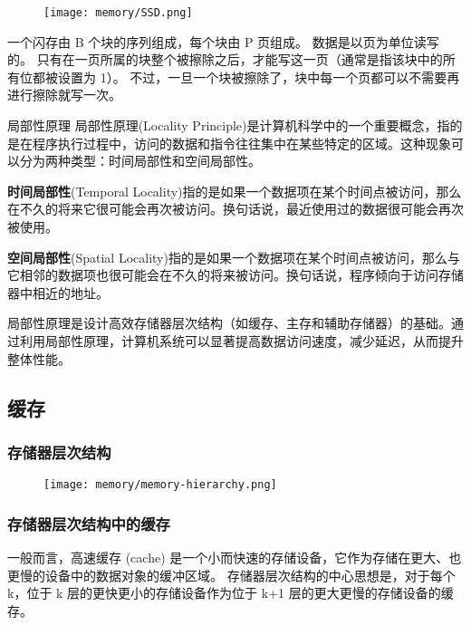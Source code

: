 \begin{figure}[H]
    \centering
    \texttt{[image: memory/SSD.png]}
\end{figure}

一个闪存由 B 个块的序列组成，每个块由 P 页组成。
数据是以页为单位读写的。
只有在一页所属的块整个被擦除之后，才能写这一页（通常是指该块中的所有位都被设置为 1）。
不过，一旦一个块被擦除了，块中每一个页都可以不需要再进行擦除就写一次。

\begin{sidenote}{局部性原理}
    局部性原理(Locality Principle)是计算机科学中的一个重要概念，指的是在程序执行过程中，访问的数据和指令往往集中在某些特定的区域。这种现象可以分为两种类型：时间局部性和空间局部性。

    \textbf{时间局部性}(Temporal Locality)指的是如果一个数据项在某个时间点被访问，那么在不久的将来它很可能会再次被访问。换句话说，最近使用过的数据很可能会再次被使用。

    \textbf{空间局部性}(Spatial Locality)指的是如果一个数据项在某个时间点被访问，那么与它相邻的数据项也很可能会在不久的将来被访问。换句话说，程序倾向于访问存储器中相近的地址。

    局部性原理是设计高效存储器层次结构（如缓存、主存和辅助存储器）的基础。通过利用局部性原理，计算机系统可以显著提高数据访问速度，减少延迟，从而提升整体性能。
\end{sidenote}


\subsection{缓存}
\subsubsection{存储器层次结构}

\begin{figure}[H]
    \centering
    \texttt{[image: memory/memory-hierarchy.png]}
\end{figure}

\subsubsection{存储器层次结构中的缓存}

一般而言，高速缓存 (cache) 是一个小而快速的存储设备，它作为存储在更大、也更慢的设备中的数据对象的缓冲区域。
存储器层次结构的中心思想是，对于每个 k，位于 k 层的更快更小的存储设备作为位于 k+1 层的更大更慢的存储设备的缓存。

